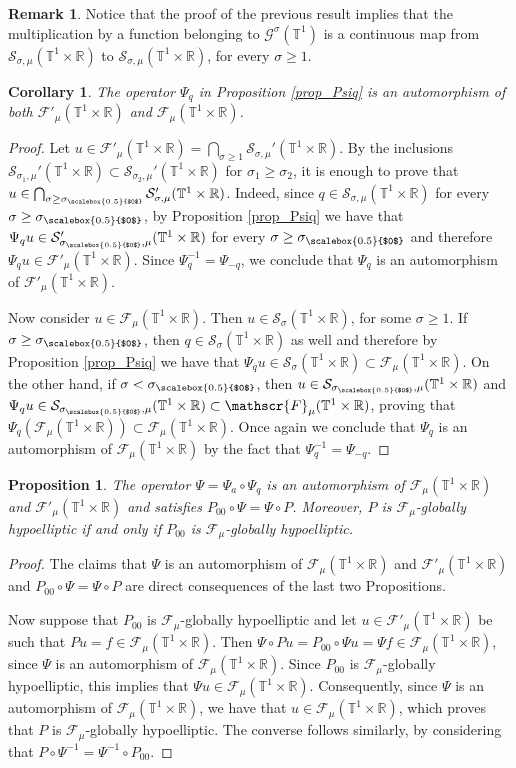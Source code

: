 \documentclass[11pt,reqno]{amsart}
\numberwithin{equation}{section}
\newtheorem{corollary}[theorem]{Corollary}
\newtheorem{prop}[theorem]{Proposition}
\theoremstyle{definition}
\newtheorem{obs}{Remark}
\theoremstyle{definition}
\newcommand{\T}{\mathbb{T}}
\newcommand{\R}{\mathbb{R}}
\newcommand{\g}{\mathbb{T}^1\times\mathbb{R}}
\newcommand{\Smu}{\mathscr{F}_{\mu}(\T^1\times\R)}
\newcommand{\SSmu}{\mathscr{F}'_{\mu}(\T^1\times\R)}
\newcommand{\scoef}{\mathcal{S}_{\sigma_{\scalebox{0.5}{$0$}},\mu}(\g)}
\newcommand{\sigmac}{\sigma_{\scalebox{0.5}{$0$}}}
\begin{document}
\begin{obs}
    Notice that the proof of the previous result implies that the multiplication by a function belonging to $\mathscr{G}^{\sigma}(\T^1)$ is a continuous map from $\mathcal{S}_{\sigma,\mu}(\g)$ to $\mathcal{S}_{\sigma,\mu}(\g)$, for every $\sigma\geq 1$. 
\end{obs}
\begin{corollary}
    The operator $\Psi_q$ in Proposition \ref{prop_Psiq} is an automorphism of both $\SSmu$ and $\Smu$.
\end{corollary}
\begin{proof}
    Let $u\in \SSmu= \bigcap_{\sigma\geq 1}\mathcal{S}_{\sigma,\mu}'(\g)$. By the inclusions $\mathcal{S}_{\sigma_1,\mu}'(\g)\subset\mathcal{S}_{\sigma_2,\mu}'(\g)$ for $\sigma_1\geq \sigma_2$, it is enough to prove that $u\in\bigcap_{\sigma\geq \sigmac}\mathcal{S}_{\sigma,\mu}'(\g)$. Indeed, since $q\in \mathcal{S}_{\sigma,\mu}(\g)$ for every $\sigma\geq\sigmac$, by Proposition \ref{prop_Psiq} we have that $\Psi_q u\in\mathcal{S}_{\sigmac,\mu}'(\g)$ for every $\sigma\geq\sigmac$ and therefore $\Psi_qu\in\SSmu$. Since $\Psi_{q}^{-1}=\Psi_{-q}$, we conclude that $\Psi_q$ is an automorphism of $\SSmu$.
    
    Now consider $u\in\Smu$. Then $u\in\mathcal{S}_{\sigma}(\g)$, for some $\sigma\geq1$. If $\sigma\geq \sigmac$, then $q\in \mathcal{S}_{\sigma}(\g)$ as well and therefore by Proposition \ref{prop_Psiq} we have that $\Psi_qu\in\mathcal{S}_{\sigma}(\g)\subset\Smu$. On the other hand, if $\sigma<\sigmac$, then $u\in \scoef$ and $\Psi_qu\in \scoef\subset\Smu$, proving that $\Psi_q(\Smu)\subset\Smu$. Once again we conclude that $\Psi_q$ is an automorphism of $\Smu$ by the fact that $\Psi_{q}^{-1}=\Psi_{-q}$.
\end{proof}


\begin{prop}\label{gh_P_P00}
    The operator $\Psi=\Psi_a\circ\Psi_q$ is an automorphism of $\Smu$ and $\SSmu$ and satisfies $P_{00}\circ\Psi=\Psi\circ P$. Moreover, $P$ is $\mathscr{F}_{\mu}$-globally hypoelliptic if and only if $P_{00}$ is $\mathscr{F}_{\mu}$-globally hypoelliptic.
\end{prop}
\begin{proof}
    The claims that $\Psi$ is an automorphism of $\Smu$ and $\SSmu$ and $P_{00}\circ \Psi=\Psi\circ P$ are direct consequences of the last two Propositions.
    
    Now suppose that $P_{00}$ is $\mathscr{F}_\mu$-globally hypoelliptic and let $u\in\SSmu$ be such that $Pu=f\in\Smu$. Then $\Psi\circ Pu=P_{00}\circ \Psi u=\Psi f\in\Smu$, since $\Psi$ is an automorphism of $\Smu$. Since $P_{00}$ is $\mathscr{F}_{\mu}$-globally hypoelliptic, this implies that $\Psi u\in\Smu$. Consequently, since $\Psi$ is an automorphism of $\Smu$, we have that $u\in\Smu$, which proves that $P$ is $\mathscr{F}_{\mu}$-globally hypoelliptic. The converse follows similarly, by considering that $P\circ \Psi^{-1}=\Psi^{-1}\circ P_{00}$.
\end{proof}
\end{document}
